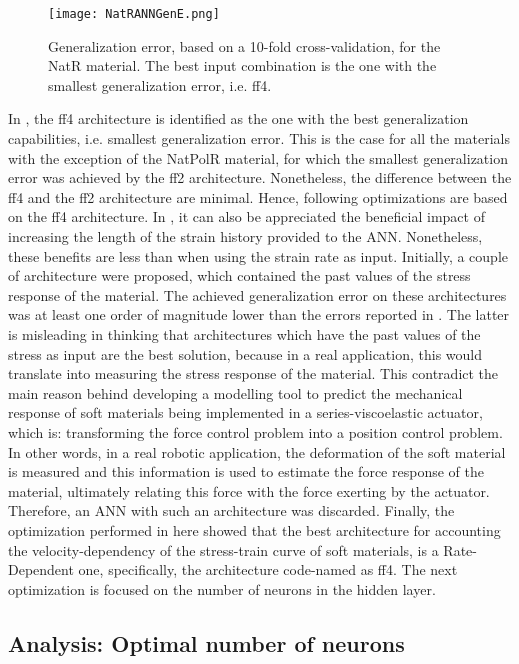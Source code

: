 \begin{figure}[htbp!]
    \centering
    \texttt{[image: NatRANNGenE.png]}
    \caption{Generalization error, based on a 10-fold cross-validation, for the NatR material. The best input combination is the one with the smallest generalization error, i.e. ff4.}
    \label{fig:ANNGenNatR}
\end{figure}

In , the ff4 architecture is identified as the one with the best generalization capabilities, i.e. smallest generalization error. This is the case for all the materials with the exception of the NatPolR material, for which the smallest generalization error was achieved by the ff2 architecture. Nonetheless, the difference between the ff4 and the ff2 architecture are minimal. Hence, following optimizations are based on the ff4 architecture. 
In , it can also be appreciated the beneficial impact of increasing the length of the strain history provided to the ANN. Nonetheless, these benefits are less than when using the strain rate as input. Initially, a couple of architecture were proposed, which contained the past values of the stress response of the material. The achieved generalization error on these architectures was at least one order of magnitude lower than the errors reported in . The latter is misleading in thinking that architectures which have the past values of the stress as input are the best solution, because in a real application, this would translate into measuring the stress response of the material. This contradict the main reason behind developing a modelling tool to predict the mechanical response of soft materials being implemented in a series-viscoelastic actuator, which is: transforming the force control problem into a position control problem. In other words, in a real robotic application, the deformation of the soft material is measured and this information is used to estimate the force response of the material, ultimately relating this force with the force exerting by the actuator. Therefore, an ANN with such an architecture was discarded. Finally, the optimization performed in here showed that the best architecture for accounting the velocity-dependency of the stress-train curve of soft materials, is a Rate-Dependent one, specifically, the architecture code-named as ff4. The next optimization is focused on the number of neurons in the hidden layer.

\subsection{Analysis: Optimal number of neurons}

